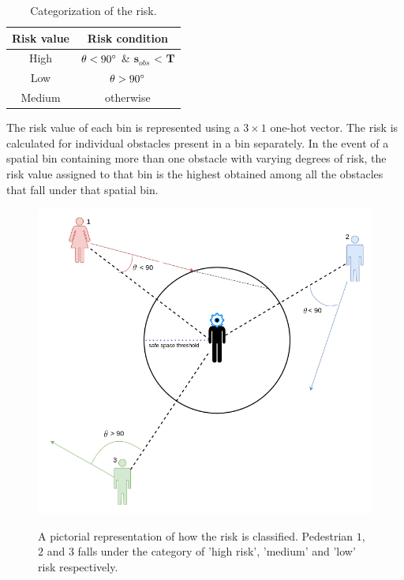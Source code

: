 \begin{table}[htbp]
    \begin{center}
        \renewcommand{\arraystretch}{1.3}
        \begin{tabular}{|c|c|}
            \hline
            Risk value & Risk condition \\
            \hline
            High & $\theta < 90\degree$ \&  $\mathbf{s}_{obs}$ < $\mathbf{T}$   \\
            
            Low & $\theta > 90\degree$\\
            
            Medium & otherwise \\
            \hline
        \end{tabular}
    	 \caption{Categorization of the risk.}
		\label{risk-categorization-table}
    \end{center}

\end{table}
\par
The risk value of each bin is represented using a $3 \times 1$ one-hot vector. The risk is calculated for individual obstacles present in a bin separately. In the event of a spatial bin containing more than one obstacle with varying degrees of risk, the risk value assigned to that bin is the highest obtained among all the obstacles that fall under that spatial bin.
\begin{figure}[!htbp]
	\centering
	\includegraphics[width=.8\linewidth]{figures/risk_picture.png}
    \label{fig:risk-calculation}
    \caption{A pictorial representation of how the risk is classified. Pedestrian $1$, $2$ and $3$ falls under the category of 'high risk', 'medium' and 'low' risk respectively.}
\end{figure}


